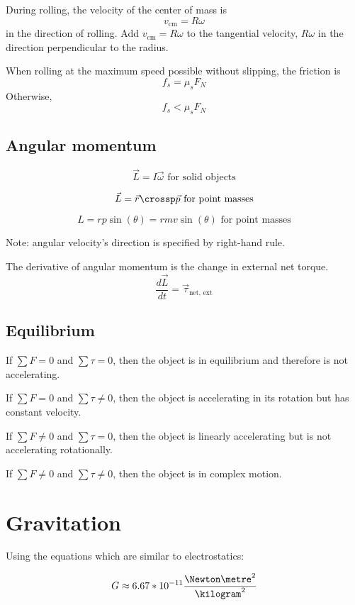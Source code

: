 During rolling, the velocity of the center of mass is
\[
	v_\text{cm} = R\omega
\]
in the direction of rolling. Add $v_\text{cm} = R\omega$ to the tangential velocity, $R\omega$ in the direction perpendicular to the radius.

When rolling at the maximum speed possible without slipping, the friction is
\[
	f_s = \mu_s F_N
\]
Otherwise,
\[
	f_s < \mu_s F_N
\]

\subsection{Angular momentum}

\[
	\vec{L} = I \vec{\omega} \text{ for solid objects}
\]

\[
	\vec{L} = \vec{r} \crossp \vec{p} \text{ for point masses}
\]

\[
	L = rp\sin(\theta) = rmv\sin(\theta) \text{ for point masses}
\]

Note: angular velocity's direction is specified by right-hand rule.

The derivative of angular momentum is the change in external net torque.
\[
	\frac{d\vec{L}}{dt} = \vec{\tau}_\text{net, ext}
\]

\subsection{Equilibrium}

If $\sum F = 0$ and $\sum \tau = 0$, then the object is in equilibrium and therefore is not accelerating.

If $\sum F = 0$ and $\sum \tau \neq 0$, then the object is accelerating in its rotation but has constant velocity.

If $\sum F \neq 0$ and $\sum \tau = 0$, then the object is linearly accelerating but is not accelerating rotationally.

If $\sum F \neq 0$ and $\sum \tau \neq 0$, then the object is in complex motion.

\section{Gravitation}

Using the equations which are similar to electrostatics:

\begin{definition}
	\[
		G \approx 6.67 * 10^{-11} \frac{\Newton \metre^2}{\kilogram^2}
	\]
\end{definition}


